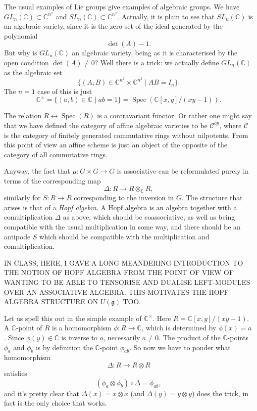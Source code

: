 \documentclass[12pt]{article}
\theoremstyle{plain}
\theoremstyle{definition}
\numberwithin{equation}{section}
\DeclareMathOperator{\spec}{Spec}
\newcommand{\op}{op}
\newcommand{\D}{\Delta}
\newcommand{\C}{\mathbb{C}}
\newcommand{\g}{\mathfrak{g}}
\newcommand{\CC}{\mathcal{C}}
\begin{document}
The usual examples of Lie groups give examples of algebraic groups. We have $GL_n(\C) \subset \C^{n^2}$ and $SL_n(\C) \subset \C^{n^2}$. Actually, it is plain to see that $SL_n(\C)$ is an algebraic variety, since it is the zero set of the ideal generated by the polynomial
\[
\det(A) - 1.
\]
But why is $GL_n(\C)$ an algebraic variety, being as it is characterised by the open condition $\det(A) \neq 0$? Well there is a trick: we actually define $GL_n(\C)$ as the algebraic set
\[
\{(A, B) \in \C^{n^2} \times \C^{n^2} \mid AB = I_n\}.
\]
The $n=1$ case of this is just
\[
\C^\times = \{(a, b) \in \C \mid ab = 1\} = \spec(\C[x, y] / (xy-1)).
\]


The relation $R \leftrightarrow \spec(R)$ is a contravariant functor. Or rather one might say that we have defined the category of affine algebraic varieties to be $\CC^{\op}$, where $\CC$ is the category of finitely generated commutative rings without nilpotents. From this point of view an affine scheme is just an object of the opposite of the category of all commutative rings.

Anyway, the fact that $\mu : G \times G \rightarrow G$ is associative can be reformulated purely in terms of the corresponding map
\[
\Delta : R \rightarrow R \otimes_\C R,
\]
similarly for $S : R \rightarrow R$ corresponding to the inversion in $G$. The structure that arises is that of a \emph{Hopf algebra}. A Hopf algebra is an algebra together with a comultiplication $\Delta$ as above, which should be coassociative, as well as being compatible with the usual multiplication in some way, and there should be an antipode $S$ which should be compatible with the multiplication and comultiplication.


{\color{blue}IN CLASS, HERE, I GAVE A LONG MEANDERING INTRODUCTION TO THE NOTION OF HOPF ALGEBRA FROM THE POINT OF VIEW OF WANTING TO BE ABLE TO TENSORISE AND DUALISE LEFT-MODULES OVER AN ASSOCIATIVE ALGEBRA. THIS MOTIVATES THE HOPF ALGEBRA STRUCTURE ON $U(\g)$ TOO.}

Let us spell this out in the simple example of $\C^\times$. Here $R = \C[x, y] / (xy-1)$. A $\C$-point of $R$ is a homomorphism $\phi : R \rightarrow \C$, which is determined by $\phi(x) = a$. Since $\phi(y) \in \C$ is inverse to $a$, necessarily $a \neq 0$. The product of the $\C$-points $\phi_a$ and $\phi_b$ is by definition the $\C$-point $\phi_{ab}$. So now we have to ponder what homomorphism
\[
\Delta : R \rightarrow R \otimes R
\]
satisfies
\[
(\phi_a \otimes \phi_b) \circ \Delta = \phi_{ab},
\]
and it's pretty clear that $\D(x) = x \otimes x$ (and $\D(y) = y \otimes y$) does the trick, in fact is the only choice that works.
\end{document}
